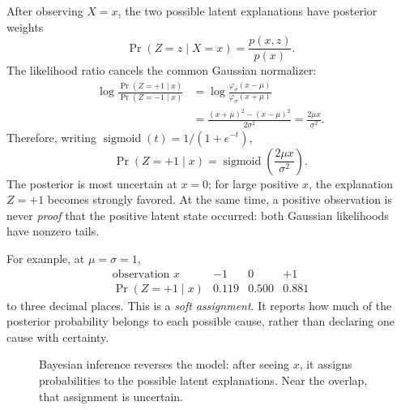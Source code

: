After observing \(X=x\), the two possible latent explanations have posterior weights
\[
 \Pr(Z=z\mid X=x)=\frac{p(x,z)}{p(x)}.
\]
The likelihood ratio cancels the common Gaussian normalizer:
\[
 \begin{aligned}
 \log\frac{\Pr(Z=+1\mid x)}{\Pr(Z=-1\mid x)}
 &=\log\frac{\varphi_\sigma(x-\mu)}
                {\varphi_\sigma(x+\mu)}\\
 &=\frac{(x+\mu)^2-(x-\mu)^2}{2\sigma^2}
 =\frac{2\mu x}{\sigma^2}.
 \end{aligned}
\]
Therefore, writing \(\operatorname{sigmoid}(t)=1/(1+e^{-t})\),
\[
 \boxed{\Pr(Z=+1\mid x)
       =\operatorname{sigmoid}\left(\frac{2\mu x}{\sigma^2}\right).}
\]
The posterior is most uncertain at \(x=0\); for large positive \(x\), the explanation \(Z=+1\) becomes strongly favored. At the same time, a positive observation is never \emph{proof} that the positive latent state occurred: both Gaussian likelihoods have nonzero tails.


For example, at \(\mu=\sigma=1\),
\[
 \begin{array}{c|ccc}
 \text{observation }x&-1&0&+1\\ \hline
 \Pr(Z=+1\mid x)&0.119&0.500&0.881
 \end{array}
\]
to three decimal places. This is a \emph{soft assignment}. It reports how much of the posterior probability belongs to each possible cause, rather than declaring one cause with certainty.

\begin{figure}[H]
\centering
{}
\caption{Bayesian inference reverses the model: after seeing \(x\), it assigns probabilities to the possible latent explanations. Near the overlap, that assignment is uncertain.}
\end{figure}

